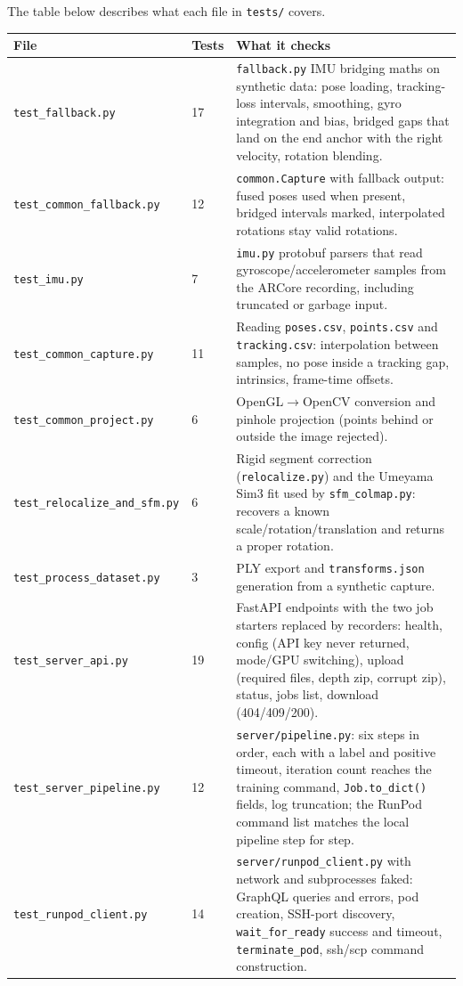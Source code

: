 The table below describes what each file in \texttt{tests/} covers.

\begin{longtable}{p{}p{}p{}}
\toprule
\textbf{File} & \textbf{Tests} & \textbf{What it checks} \\
\midrule
\endhead
\texttt{test\_fallback.py} & 17 & \texttt{fallback.py} IMU bridging maths on synthetic data: pose loading, tracking-loss intervals, smoothing, gyro integration and bias, bridged gaps that land on the end anchor with the right velocity, rotation blending. \\
\texttt{test\_common\_fallback.py} & 12 & \texttt{common.Capture} with fallback output: fused poses used when present, bridged intervals marked, interpolated rotations stay valid rotations. \\
\texttt{test\_imu.py} & 7 & \texttt{imu.py} protobuf parsers that read gyroscope/accelerometer samples from the ARCore recording, including truncated or garbage input. \\
\texttt{test\_common\_capture.py} & 11 & Reading \texttt{poses.csv}, \texttt{points.csv} and \texttt{tracking.csv}: interpolation between samples, no pose inside a tracking gap, intrinsics, frame-time offsets. \\
\texttt{test\_common\_project.py} & 6 & OpenGL$\rightarrow$OpenCV conversion and pinhole projection (points behind or outside the image rejected). \\
\texttt{test\_relocalize\_and\_sfm.py} & 6 & Rigid segment correction (\texttt{relocalize.py}) and the Umeyama Sim3 fit used by \texttt{sfm\_colmap.py}: recovers a known scale/rotation/translation and returns a proper rotation. \\
\texttt{test\_process\_dataset.py} & 3 & PLY export and \texttt{transforms.json} generation from a synthetic capture. \\
\texttt{test\_server\_api.py} & 19 & FastAPI endpoints with the two job starters replaced by recorders: health, config (API key never returned, mode/GPU switching), upload (required files, depth zip, corrupt zip), status, jobs list, download (404/409/200). \\
\texttt{test\_server\_pipeline.py} & 12 & \texttt{server/pipeline.py}: six steps in order, each with a label and positive timeout, iteration count reaches the training command, \texttt{Job.to\_dict()} fields, log truncation; the RunPod command list matches the local pipeline step for step. \\
\texttt{test\_runpod\_client.py} & 14 & \texttt{server/runpod\_client.py} with network and subprocesses faked: GraphQL queries and errors, pod creation, SSH-port discovery, \texttt{wait\_for\_ready} success and timeout, \texttt{terminate\_pod}, ssh/scp command construction. \\

\end{longtable}
